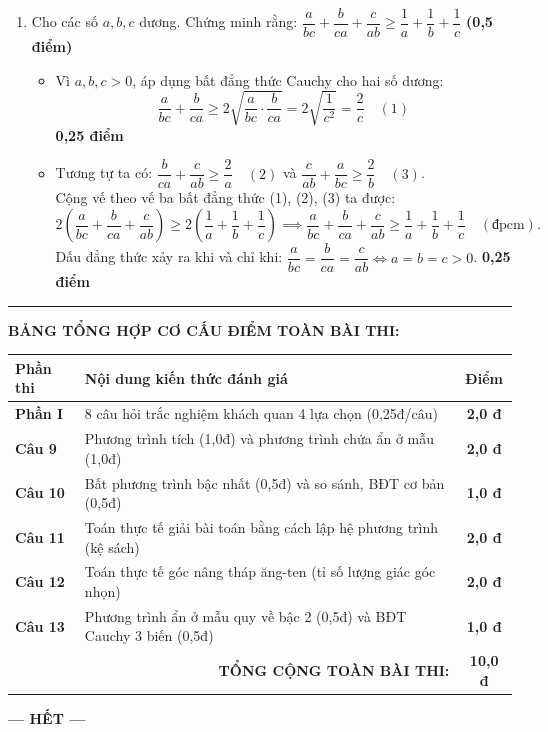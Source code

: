 \documentclass[12pt,a4paper]{article}
\begin{document}
\begin{enumerate}[label=\arabic*), leftmargin=18pt, itemsep=2.5pt, parsep=0pt]
  \item Cho các số $a, b, c$ dương. Chứng minh rằng:
  $\dfrac{a}{bc} + \dfrac{b}{ca} + \dfrac{c}{ab} \ge \dfrac{1}{a} + \dfrac{1}{b} + \dfrac{1}{c}$ \hfill \textbf{(0,5 điểm)}
  \begin{itemize}[leftmargin=16pt, itemsep=1.5pt, parsep=0pt]
    \item Vì $a, b, c > 0$, áp dụng bất đẳng thức Cauchy cho hai số dương:
    \[
      \frac{a}{bc} + \frac{b}{ca} \ge 2\sqrt{\frac{a}{bc} \cdot \frac{b}{ca}} = 2\sqrt{\frac{1}{c^2}} = \frac{2}{c} \quad (1)
    \] \dotfill \textbf{0,25 điểm}
    \item Tương tự ta có: $\dfrac{b}{ca} + \dfrac{c}{ab} \ge \dfrac{2}{a} \quad (2)$ và $\dfrac{c}{ab} + \dfrac{a}{bc} \ge \dfrac{2}{b} \quad (3)$.\\
    Cộng vế theo vế ba bất đẳng thức (1), (2), (3) ta được:
    \[
      2\left(\frac{a}{bc} + \frac{b}{ca} + \frac{c}{ab}\right) \ge 2\left(\frac{1}{a} + \frac{1}{b} + \frac{1}{c}\right)
      \implies \frac{a}{bc} + \frac{b}{ca} + \frac{c}{ab} \ge \frac{1}{a} + \frac{1}{b} + \frac{1}{c} \quad (\text{đpcm}).
    \]
    Dấu đẳng thức xảy ra khi và chỉ khi: $\dfrac{a}{bc} = \dfrac{b}{ca} = \dfrac{c}{ab} \iff a = b = c > 0$. \dotfill \textbf{0,25 điểm}
  \end{itemize}
\end{enumerate}

\vspace{2mm}
\hrule
\vspace{2mm}

\noindent\textbf{\large BẢNG TỔNG HỢP CƠ CẤU ĐIỂM TOÀN BÀI THI:}
\begin{center}
\small
\renewcommand{\arraystretch}{1.1}
\begin{tabular}{|l|p{11.8cm}|c|}
\hline
\textbf{Phần thi} & \textbf{Nội dung kiến thức đánh giá} & \textbf{Điểm} \\
\hline
\textbf{Phần I} & 8 câu hỏi trắc nghiệm khách quan 4 lựa chọn (0,25đ/câu) & \textbf{2,0 đ} \\
\hline
\textbf{Câu 9} & Phương trình tích (1,0đ) và phương trình chứa ẩn ở mẫu (1,0đ) & \textbf{2,0 đ} \\
\hline
\textbf{Câu 10} & Bất phương trình bậc nhất (0,5đ) và so sánh, BĐT cơ bản (0,5đ) & \textbf{1,0 đ} \\
\hline
\textbf{Câu 11} & Toán thực tế giải bài toán bằng cách lập hệ phương trình (kệ sách) & \textbf{2,0 đ} \\
\hline
\textbf{Câu 12} & Toán thực tế góc nâng tháp ăng-ten (tỉ số lượng giác góc nhọn) & \textbf{2,0 đ} \\
\hline
\textbf{Câu 13} & Phương trình ẩn ở mẫu quy về bậc 2 (0,5đ) và BĐT Cauchy 3 biến (0,5đ) & \textbf{1,0 đ} \\
\hline
\multicolumn{2}{|r|}{\textbf{TỔNG CỘNG TOÀN BÀI THI:}} & \textbf{10,0 đ} \\
\hline
\end{tabular}
\end{center}

\vspace{1mm}
\begin{center}
  \textbf{--- HẾT ---}
\end{center}
\end{document}
